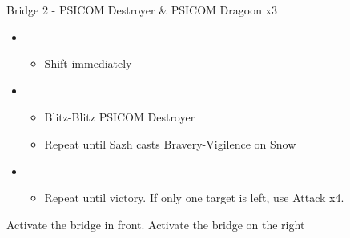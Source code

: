 \documentclass{report}
\begin{document}
\begin{battle}{Bridge 2 - PSICOM Destroyer \& PSICOM Dragoon x3}
\begin{itemize}
    \item \first
    \begin{itemize}
        \item Shift immediately
    \end{itemize}
    \item \third
    \begin{itemize}
        \item Blitz-Blitz PSICOM Destroyer
        \item Repeat until Sazh casts Bravery-Vigilence on Snow
    \end{itemize}
    \item \fifth
    \begin{itemize}
        \item Repeat until victory. If only one target is left, use Attack x4.
    \end{itemize}
\end{itemize}
  
\end{battle}
Activate the bridge in front.  Activate the bridge on the right
\end{document}
